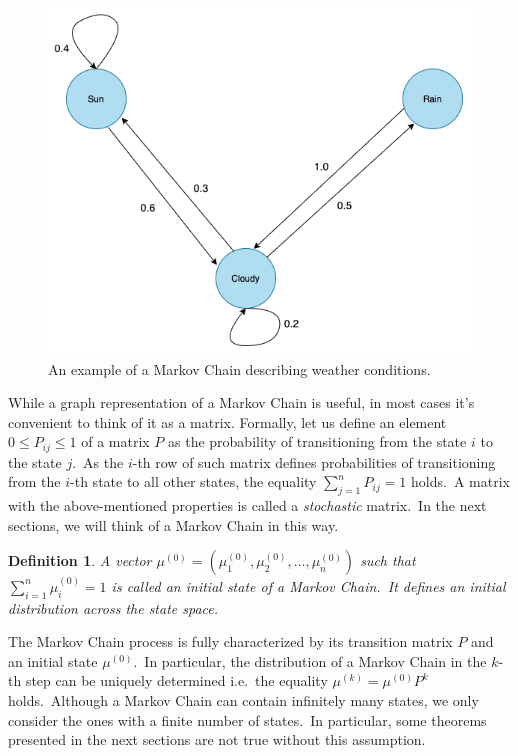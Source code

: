 \documentclass[a4paper, 11pt, onecolumn, openany, titlepage]{report}
\theoremstyle{default_theorem_style}\newtheorem{theorem}{Theorem}
\theoremstyle{default_theorem_style}\newtheorem{definition}{Definition}
\begin{document}
\begin{figure}[H]
\centering
\includegraphics[scale=0.4]{markov_chain}
\caption{An example of a Markov Chain describing weather conditions.}
\label{fig:markov_chain}
\end{figure}

While a graph representation of a Markov Chain is useful, in most cases it's convenient to think of it as a matrix.
Formally, let us define an element $0 \leq P_{ij} \leq 1$ of a matrix $P$ as the probability of
transitioning from the state $i$ to the state $j$.\ As the $i$-th row of such matrix defines probabilities of
transitioning from the $i$-th  state to all other states, the equality $\sum_{j = 1}^{n} P_{ij} = 1$ holds.\ A
matrix with the above-mentioned properties is called a \textit{stochastic} matrix.\ In the next sections, we will think
of a Markov Chain in this way.

\begin{definition}
A vector $\mu^{(0)} = (\mu^{(0)}_1, \mu^{(0)}_2, \dots, \mu^{(0)}_n)$ such that $\sum_{i=1}^{n} \mu^{(0)}_i = 1$
is called an \textit{initial state} of a Markov Chain.\ It defines an initial distribution across the state space.

\end{definition}

The Markov Chain process is fully characterized by its transition matrix $P$ and an initial state $\mu^{(0)}$.\ In
particular, the distribution of a Markov Chain in the $k$-th step can be uniquely determined i.e.\ the equality
$\mu^{(k)} = \mu^{(0)}P^k$ holds.\ Although a Markov Chain can contain infinitely many states, we only consider
the ones with a finite number of states.\ In particular, some theorems presented in the next sections
are not true without this assumption.\newline
\end{document}
